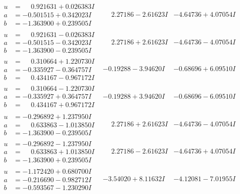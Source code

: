 \documentclass[1p]{elsarticle_modified}
\theoremstyle{definition}
\begin{document}
$$\begin{array}{c|c|c}
\begin{aligned}
u &= \phantom{-}0.921631 + 0.026383 I \\
a &= -0.501515 + 0.342023 I \\
b &= -1.363900 + 0.239505 I\end{aligned}
 & \phantom{-}2.27186 - 2.61623 I & -4.64736 + 4.07054 I \\ \hline\begin{aligned}
u &= \phantom{-}0.921631 - 0.026383 I \\
a &= -0.501515 - 0.342023 I \\
b &= -1.363900 - 0.239505 I\end{aligned}
 & \phantom{-}2.27186 + 2.61623 I & -4.64736 - 4.07054 I \\ \hline\begin{aligned}
u &= \phantom{-}0.310664 + 1.220730 I \\
a &= -0.335927 - 0.364757 I \\
b &= \phantom{-}0.434167 - 0.967172 I\end{aligned}
 & -0.19288 - 3.94620 I & -0.68696 + 6.09510 I \\ \hline\begin{aligned}
u &= \phantom{-}0.310664 - 1.220730 I \\
a &= -0.335927 + 0.364757 I \\
b &= \phantom{-}0.434167 + 0.967172 I\end{aligned}
 & -0.19288 + 3.94620 I & -0.68696 - 6.09510 I \\ \hline\begin{aligned}
u &= -0.296892 + 1.237950 I \\
a &= \phantom{-}0.633863 - 1.013850 I \\
b &= -1.363900 - 0.239505 I\end{aligned}
 & \phantom{-}2.27186 + 2.61623 I & -4.64736 - 4.07054 I \\ \hline\begin{aligned}
u &= -0.296892 - 1.237950 I \\
a &= \phantom{-}0.633863 + 1.013850 I \\
b &= -1.363900 + 0.239505 I\end{aligned}
 & \phantom{-}2.27186 - 2.61623 I & -4.64736 + 4.07054 I \\ \hline\begin{aligned}
u &= -1.172420 + 0.680700 I \\
a &= -0.216690 - 0.982712 I \\
b &= -0.593567 - 1.230290 I\end{aligned}
 & -3.54020 + 8.11632 I & -4.12081 - 7.01955 I \\ \hline\begin{aligned}

\end{aligned}
\end{array}$$
\end{document}
